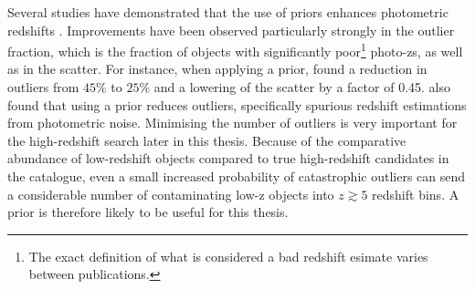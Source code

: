 Several studies have demonstrated that the use of priors enhances photometric redshifts \citep{2000ApJ...536..571B,2006A&A...457..841I,2015ApJ...801...20T}. Improvements have been observed particularly strongly in the outlier fraction, which is the fraction of objects with significantly poor\footnote{The exact definition of what is considered a bad redshift esimate varies between publications.} photo-zs, as well as in the scatter. For instance, when applying a prior, \cite{2015ApJ...801...20T} found a reduction in outliers from $45\%$ to $25\%$ and a lowering of the scatter by a factor of 0.45. \cite{2000ApJ...536..571B} also found that using a prior reduces outliers, specifically spurious redshift estimations from photometric noise. Minimising the number of outliers is very important for the high-redshift search later in this thesis. Because of the comparative abundance of low-redshift objects compared to true high-redshift candidates in the \DESVIDEO catalogue, even a small increased probability of catastrophic outliers can send a considerable number of contaminating low-z objects into $z\gtrsim5$ redshift bins. A prior is therefore likely to be useful for this thesis.\par





